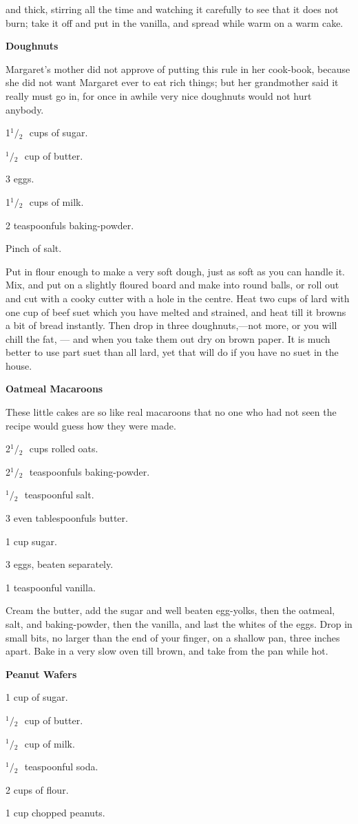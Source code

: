 \documentclass[11pt]{book}
\newcommand{\indpar}{\par\noindent\hspace*{\parindent}}
\newcommand{\ingredient}{\indpar}
\newcommand{\instruction}{\indpar}
\newcommand{\OneHalf}{\ensuremath{{}^1\!\!/\!{}_2\mbox{\ }}}
\newenvironment{RecipeTitle}{\medskip\begin{center}\large\bf }{\end{center}\smallskip}
\begin{document}
and thick, stirring all the time and watching it carefully to
see that it does not burn; take it off and put in the vanilla,
and spread while warm on a warm cake.
\begin{RecipeTitle}
Doughnuts\label{doughnuts}
\end{RecipeTitle}
\indpar
  Margaret's mother did not approve of put\-ting this rule in
her cook-book, because she did not want Margaret ever to eat
rich things; but her grandmother said it really must go in,
for once in awhile very nice doughnuts would not hurt anybody.
\ingredient  1\OneHalf cups of sugar.
\ingredient  \OneHalf cup of butter.
\ingredient  3 eggs.
\ingredient  1\OneHalf cups of milk.
\ingredient  2 teaspoonfuls baking-powder.
\ingredient  Pinch of salt.
\instruction  Put in flour enough to make a very soft dough, just as soft
as you can handle it.  Mix, and put on a slightly floured
board and make into round balls, or roll out and cut with a
cooky cutter with a hole in the centre.  Heat two cups of lard
with one cup of beef suet which you have melted and strained,
and heat till it browns a bit of bread instantly.  Then drop
in three doughnuts,---not more, or you will chill the fat,
--- and when you take them out dry on brown paper.  It is much
better to use part suet than all lard, yet that will do if you
have no suet in the house.
\begin{RecipeTitle}
Oatmeal Macaroons\label{oatmeal_macaroons}
\end{RecipeTitle}
\instruction  These little cakes are so like real macaroons that no one
who had not seen the recipe would guess how they were made.
\ingredient  2\OneHalf cups rolled oats.
\ingredient  2\OneHalf teaspoonfuls baking-powder.
\ingredient  \OneHalf teaspoonful salt.
\ingredient  3 even tablespoonfuls butter.
\ingredient  1 cup sugar.
\ingredient  3 eggs, beaten separately.
\ingredient  1 teaspoonful vanilla.
\instruction  Cream the butter, add the sugar and well beaten egg-yolks,
then the oatmeal, salt, and baking-powder, then the vanilla,
and last the whites of the eggs.  Drop in small bits, no
larger than the end of your finger, on a shallow pan, three
inches apart.  Bake in a very slow oven till brown, and take
from the pan while hot.
\begin{RecipeTitle}
Peanut Wafers\label{peanut_wafers}
\end{RecipeTitle}
\ingredient  1 cup of sugar.
\ingredient  \OneHalf cup of butter.
\ingredient  \OneHalf cup of milk.
\ingredient  \OneHalf teaspoonful soda.
\ingredient  2 cups of flour.
\ingredient  1 cup chopped peanuts.
\end{document}
